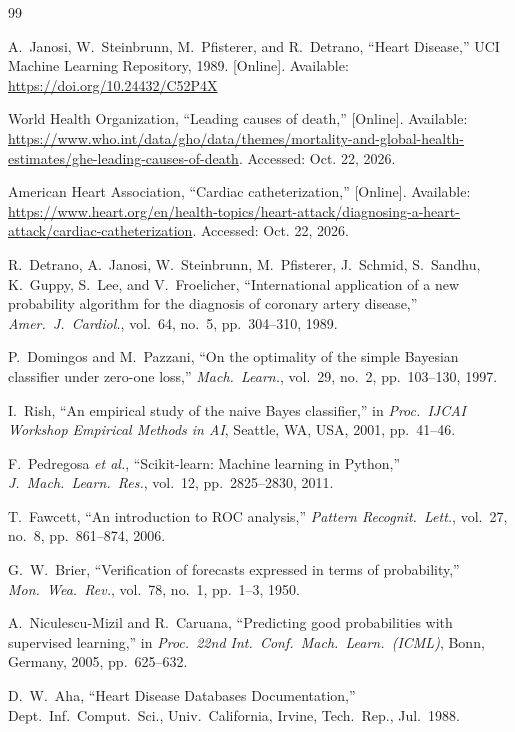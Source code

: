 \documentclass[conference]{IEEEtran}
\begin{document}
\begin{thebibliography}{99}

A.~Janosi, W.~Steinbrunn, M.~Pfisterer, and R.~Detrano,
``Heart Disease,''
UCI Machine Learning Repository, 1989.
[Online]. Available: \url{https://doi.org/10.24432/C52P4X}

World Health Organization,
``Leading causes of death,''
[Online]. Available: \url{https://www.who.int/data/gho/data/themes/mortality-and-global-health-estimates/ghe-leading-causes-of-death}. Accessed: Oct. 22, 2026.

American Heart Association,
``Cardiac catheterization,''
[Online]. Available: \url{https://www.heart.org/en/health-topics/heart-attack/diagnosing-a-heart-attack/cardiac-catheterization}. Accessed: Oct. 22, 2026.

R.~Detrano, A.~Janosi, W.~Steinbrunn, M.~Pfisterer, J.~Schmid, S.~Sandhu, K.~Guppy, S.~Lee, and V.~Froelicher,
``International application of a new probability algorithm for the diagnosis of coronary artery disease,''
\textit{Amer.\ J.\ Cardiol.}, vol.~64, no.~5, pp.~304--310, 1989.

P.~Domingos and M.~Pazzani,
``On the optimality of the simple Bayesian classifier under zero-one loss,''
\textit{Mach.\ Learn.}, vol.~29, no.~2, pp.~103--130, 1997.

I.~Rish,
``An empirical study of the naive Bayes classifier,''
in \textit{Proc.\ IJCAI Workshop Empirical Methods in AI}, Seattle, WA, USA, 2001, pp.~41--46.

F.~Pedregosa \textit{et al.},
``Scikit-learn: Machine learning in Python,''
\textit{J.\ Mach.\ Learn.\ Res.}, vol.~12, pp.~2825--2830, 2011.

T.~Fawcett,
``An introduction to ROC analysis,''
\textit{Pattern Recognit.\ Lett.}, vol.~27, no.~8, pp.~861--874, 2006.

G.~W.~Brier,
``Verification of forecasts expressed in terms of probability,''
\textit{Mon.\ Wea.\ Rev.}, vol.~78, no.~1, pp.~1--3, 1950.

A.~Niculescu-Mizil and R.~Caruana,
``Predicting good probabilities with supervised learning,''
in \textit{Proc.\ 22nd Int.\ Conf.\ Mach.\ Learn.\ (ICML)}, Bonn, Germany, 2005, pp.~625--632.

D.~W.~Aha,
``Heart Disease Databases Documentation,''
Dept.\ Inf.\ Comput.\ Sci., Univ.\ California, Irvine, Tech.\ Rep., Jul.\ 1988.


\end{thebibliography}
\end{document}
